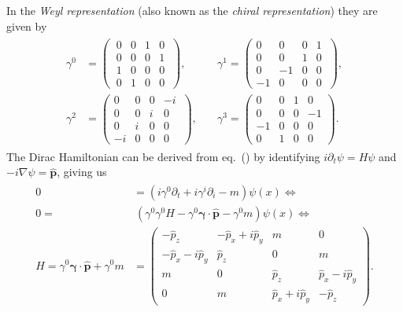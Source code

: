 \documentclass{report}
\begin{document}
In the \textit{Weyl representation} (also known as the \textit{chiral representation}) they are given by
\begin{align}
\begin{aligned}
\gamma^0 &=
\begin{pmatrix}
\: 0 & 0 & 1 & 0 \:\\
\: 0 & 0 & 0 & 1 \: \\
\: 1 & 0 & 0 & 0 \: \\
\: 0 & 1 & 0 & 0 \:
\end{pmatrix}
, \quad
&\gamma^1 =
\begin{pmatrix} 
0 & 0 & 0 & 1 \: \\
0 & 0 & 1 & 0 \: \\
0 & -1 & 0 & 0 \: \\
-1 & 0 & 0 & 0 \:
\end{pmatrix},
\\
\gamma^2 &=
\begin{pmatrix}
0 & 0 & 0 & -i \: \\
0 & 0 & i & 0 \: \\
0 & i & 0 & 0 \: \\
-i & 0 & 0 & 0 \:
\end{pmatrix}
, \quad
&\gamma^3 =
\begin{pmatrix}
0 & 0 & 1 & 0 \\
0 & 0 & 0 & -1 \\
-1 & 0 & 0 & 0 \\
0 & 1 & 0 & 0 
\end{pmatrix}.
\end{aligned}
\end{align}
The Dirac Hamiltonian can be derived from eq.\ () by identifying $i \partial_t \psi= H \psi$ and $-i \nabla \psi = \hat{\boldsymbol p}$, giving us
\begin{align}
\begin{aligned}
0 &= (i \gamma^0 \partial_t +i \gamma^i \partial_i - m) \psi(x) \Leftrightarrow
\\
0 =& \: (\gamma^0 \gamma^0 H - \gamma^0 \boldsymbol \gamma \cdot \hat{\boldsymbol p} - \gamma^0 m) \psi(x)
\Leftrightarrow \\
H = \gamma^0 \boldsymbol \gamma \cdot \hat{\boldsymbol p} + \gamma^0 m &=
\begin{pmatrix}
-\hat p_z & -\hat p_x + i\hat p_y & m & 0 \\
-\hat p_x - i\hat p_y & \hat p_z & 0 & m \\
m & 0 & \hat p_z & \hat p_x - i\hat p_y \\
0 & m & \hat p_x + i\hat p_y & -\hat p_z 
\end{pmatrix}.
\label{dirac_H}
\end{aligned}
\end{align}
\end{document}
